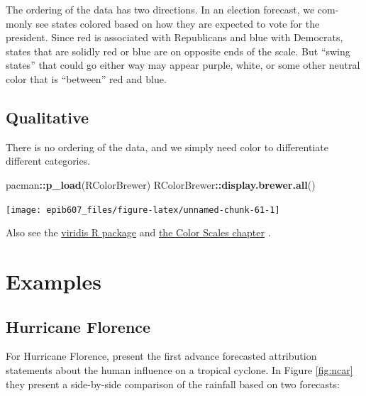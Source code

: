 \documentclass[]{book}
\makeatletter
\newenvironment{Shaded}{\begin{snugshade}}{\end{snugshade}}
\newcommand{\KeywordTok}[1]{\textcolor[rgb]{0.13,0.29,0.53}{\textbf{#1}}}
\newcommand{\OperatorTok}[1]{\textcolor[rgb]{0.81,0.36,0.00}{\textbf{#1}}}
\newcommand{\NormalTok}[1]{#1}
\newenvironment{kframe}{%
\medskip{}
\setlength{\fboxsep}{.8em}
 \def\at@end@of@kframe{}%
 \ifinner\ifhmode%
  \def\at@end@of@kframe{\end{minipage}}%
  \begin{minipage}{\columnwidth}%
 \fi\fi%
 \def\FrameCommand##1{\hskip\@totalleftmargin \hskip-\fboxsep
 \colorbox{shadecolor}{##1}\hskip-\fboxsep
     \hskip-\linewidth \hskip-\@totalleftmargin \hskip\columnwidth}%
 \MakeFramed {\advance\hsize-\width
   \@totalleftmargin\z@ \linewidth\hsize
   \@setminipage}}%
 {\par\unskip\endMakeFramed%
 \at@end@of@kframe}
\renewenvironment{Shaded}{\begin{kframe}}{\end{kframe}}
\theoremstyle{definition}
\theoremstyle{definition}
\theoremstyle{definition}
\theoremstyle{remark}
\makeatother
\begin{document}
The ordering of the data has two directions. In an election forecast, we
com- monly see states colored based on how they are expected to vote for
the president. Since red is associated with Republicans and blue with
Democrats, states that are solidly red or blue are on opposite ends of
the scale. But ``swing states'' that could go either way may appear
purple, white, or some other neutral color that is ``between'' red and
blue.

\subsection{Qualitative}\label{qualitative}

There is no ordering of the data, and we simply need color to
differentiate different categories.

\begin{Shaded}
\begin{Highlighting}[]
\NormalTok{pacman}\OperatorTok{::}\KeywordTok{p_load}\NormalTok{(RColorBrewer)}
\NormalTok{RColorBrewer}\OperatorTok{::}\KeywordTok{display.brewer.all}\NormalTok{()}
\end{Highlighting}
\end{Shaded}

\begin{center}\texttt{[image: epib607\_files/figure-latex/unnamed-chunk-61-1]} \end{center}

Also see the
\href{https://cran.r-project.org/web/packages/viridis/vignettes/intro-to-viridis.html}{viridis
R package} and
\href{https://serialmentor.com/dataviz/color-basics.html}{the Color
Scales chapter} \citep{wilke}.

\section{Examples}\label{examples}

\subsection{Hurricane Florence}\label{hurricane-florence}

For Hurricane Florence, \citet{ncar} present the first advance
forecasted attribution statements about the human influence on a
tropical cyclone. In Figure \ref{fig:ncar} they present a side-by-side
comparison of the rainfall based on two forecasts:
\end{document}
